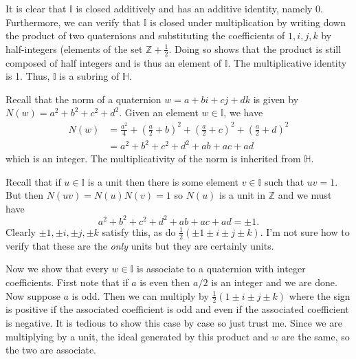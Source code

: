 \documentclass[../../master.tex]{subfiles}
\begin{document}
\begin{solution}
    It is clear that $\mathbb{I}$ is closed additively and has an additive identity, namely 0.
    Furthermore, we can verify that $\mathbb{I}$ is closed under multiplication by writing down the product of two quaternions and substituting the coefficients of $1, i, j, k$ by half-integers (elements of the set $\mathbb{Z} + \frac{1}{2}$.
    Doing so shows that the product is still composed of half integers and is thus an element of $\mathbb{I}$.
    The multiplicative identity is 1.
    Thus, $\mathbb{I}$ is a subring of $\mathbb{H}$.

    Recall that the norm of a quaternion $w = a + bi + cj + dk$ is given by $N(w) = a^2 + b^2 + c^2 + d^2$.
    Given an element $w \in \mathbb{I}$, we have
    \begin{align*}
        N(w) &= \frac{a^2}{4} + \left( \frac{a}{2} + b\right)^2 + \left( \frac{a}{2} + c\right)^2 + \left( \frac{a}{2} + d\right)^2 \\
             &= a^2 + b^2 + c^2 + d^2 + ab + ac + ad
    \end{align*}
    which is an integer.
    The multiplicativity of the norm is inherited from $\mathbb{H}$.

    Recall that if $u \in \mathbb{I}$ is a unit then there is some element $v \in \mathbb{I}$ such that $uv = 1$.
    But then $N(uv) = N(u) N(v) = 1$ so $N(u)$ is a unit in $\mathbb{Z}$ and we must have
    \[
    a^2 + b^2 + c^2 + d^2 + ab + ac + ad = \pm 1.
    \]
    Clearly $\pm 1, \pm i, \pm j, \pm k$ satisfy this, as do $\frac{1}{2} (\pm 1 \pm i \pm j \pm k)$.
    I'm not sure how to verify that these are the \textit{only} units but they are certainly units.

    Now we show that every $w \in \mathbb{I}$ is associate to a quaternion with integer coefficients.
    First note that if $a$ is even then $a / 2$ is an integer and we are done.
    Now suppose $a$ is odd.
    Then we can multiply by $\frac{1}{2} (1 \pm i \pm j \pm k)$ where the sign is positive if the associated coefficient is odd and even if the associated coefficient is negative.
    It is tedious to show this case by case so just trust me.
    Since we are multiplying by a unit, the ideal generated by this product and $w$ are the same, so the two are associate.
\end{solution}
\end{document}
